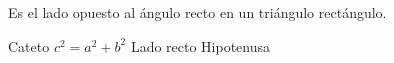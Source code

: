 
\question Es el lado opuesto al ángulo recto en un triángulo rectángulo.

  \begin{oneparchoices}
    \choice Cateto
    \choice $c^2 = a^2 + b^2$
    \choice Lado recto
    \CorrectChoice Hipotenusa
  \end{oneparchoices}
  \answerline[D]
